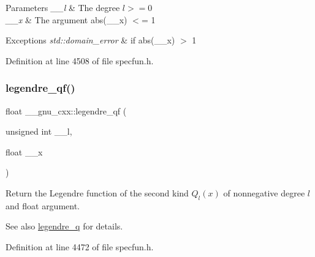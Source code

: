 \begin{DoxyParams}{Parameters}
{\em \+\_\+\+\_\+l} & The degree $ l >= 0 $ \\
\hline
{\em \+\_\+\+\_\+x} & The argument {\ttfamily abs(\+\_\+\+\_\+x)} $<$= 1 \\
\hline
\end{DoxyParams}

\begin{DoxyExceptions}{Exceptions}
{\em std\+::domain\+\_\+error} & if {\ttfamily abs(\+\_\+\+\_\+x)} $>$ 1 \\
\hline
\end{DoxyExceptions}


Definition at line 4508 of file specfun.\+h.

\mbox{\label{group__gnu__math__spec__func_ga46cf4d58886af402c6776bc090b4e4a7}} 
\subsubsection{\texorpdfstring{legendre\+\_\+qf()}{legendre\_qf()}}
{\footnotesize\ttfamily float \+\_\+\+\_\+gnu\+\_\+cxx\+::legendre\+\_\+qf (\begin{DoxyParamCaption}\item[{unsigned int}]{\+\_\+\+\_\+l,  }\item[{float}]{\+\_\+\+\_\+x }\end{DoxyParamCaption})\hspace{0.3cm}{\ttfamily [inline]}}

Return the Legendre function of the second kind $ Q_l(x) $ of nonnegative degree $ l $ and {\ttfamily float} argument.

\begin{DoxySeeAlso}{See also}
\hyperlink{group__gnu__math__spec__func_gadad5b22d0075dca31690907668af568f}{legendre\+\_\+q} for details. 
\end{DoxySeeAlso}


Definition at line 4472 of file specfun.\+h.

\mbox{\label{group__gnu__math__spec__func_ga60feac5a8bd733abee6610adf15208f2}} 
